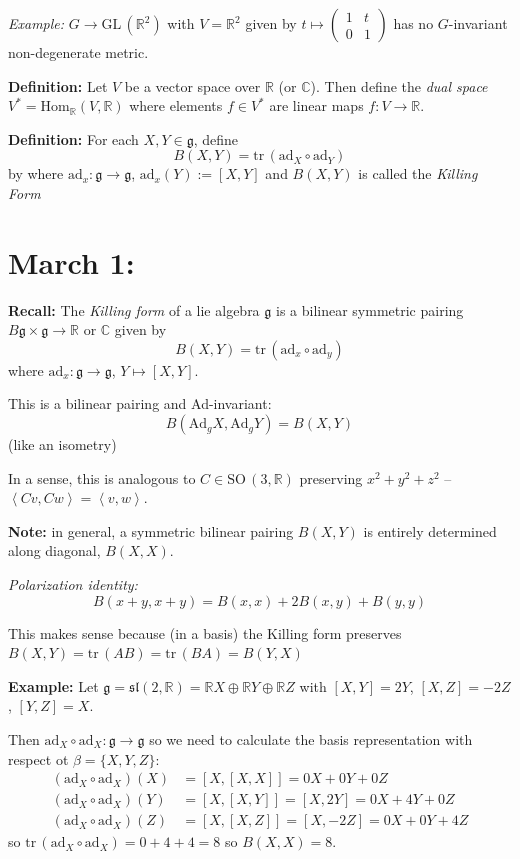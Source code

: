 \documentclass[12pt]{article}
\newcommand{\R}{\mathbb{R}}
\newcommand{\C}{\mathbb{C}}
\newcommand{\brak}[1]{\left\langle #1 \right\rangle}
\newcommand{\SO}{\text{SO}\,}
\newcommand{\GL}{\text{GL}\,}
\newcommand{\tr}{\text{tr}\,}
\newcommand{\g}{\mathfrak{g}}
\newcommand{\slf}{\mathfrak{sl}}
\begin{document}
    \emph{Example:} $G \to \GL(\R^2)$ with $V = \R^2$ given by $t \mapsto \begin{pmatrix}
        1 & t\\ 
        0 & 1
    \end{pmatrix}$ has no $G$-invariant non-degenerate metric. 

    \textbf{Definition:} Let $V$ be a vector space over $\R$ (or $\C$). Then define the \emph{dual space} $V^* = \text{Hom}_{\R}(V, \R)$ where elements $f \in V^*$ are linear maps $f: V \to \R$.

    \textbf{Definition:} For each $X, Y \in \g$, define 
    \[B(X, Y) = \tr(\text{ad}_X \circ \text{ad}_Y)\]
    by where $\text{ad}_x: \g \to \g$, $\text{ad}_x(Y) := [X, Y]$ and $B(X, Y)$ is called the \emph{Killing Form}

\section{March 1:}
    \textbf{Recall:} The \emph{Killing form} of a lie algebra $\g$ is a bilinear symmetric pairing $B \g \times \g \to \R \text{ or } \C$ given by
    \[B(X, Y) = \tr(\text{ad}_x \circ \text{ad}_y)\]
    where $\text{ad}_x: \g \to \g$, $Y \mapsto [X, Y]$.

    This is a bilinear pairing and Ad-invariant: 
    \[B(\text{Ad}_g X, \text{Ad}_g Y) = B(X, Y)\] 
    (like an isometry)

    In a sense, this is analogous to $C \in \SO(3, \R)$ preserving $x^2 + y^2 + z^2$ -- $\brak{Cv, Cw} = \brak{v, w}$. 

    \textbf{Note:} in general, a symmetric bilinear pairing $B(X, Y)$ is entirely determined along diagonal, $B(X, X)$.

    \emph{Polarization identity:}
    \[B(x + y, x + y) = B(x, x) + 2B(x, y) + B(y, y)\] 

    This makes sense because (in a basis) the Killing form preserves $B(X, Y) = \tr(AB) = \tr(BA) = B(Y, X)$

    \textbf{Example:} Let $\g = \slf(2, \R) = \R X \oplus \R Y \oplus \R Z$ with $[X, Y] = 2Y$, $[X, Z] = -2Z$, $[Y, Z] = X$. 

    Then $\text{ad}_X \circ \text{ad}_X: \g \to \g$ so we need to calculate the basis representation with respect ot $\beta = \{X, Y, Z\}$: 
    \begin{align*}
        (\text{ad}_X \circ \text{ad}_X)(X) &= [X, [X, X]] = 0X + 0Y + 0Z\\ 
        (\text{ad}_X \circ \text{ad}_X)(Y) &= [X, [X, Y]] = [X, 2Y] = 0X + 4Y + 0Z\\ 
        (\text{ad}_X \circ \text{ad}_X)(Z) &= [X, [X, Z]] = [X, -2Z] = 0X + 0Y + 4Z
    \end{align*}
    so $\tr(\text{ad}_X \circ \text{ad}_X) = 0 + 4 + 4 = 8$ so $B(X, X) = 8$.
\end{document}

